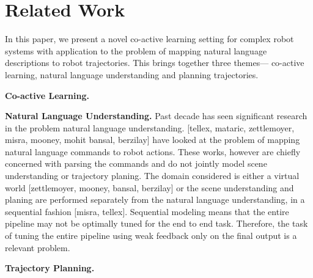 \section{Related Work}
In this paper, we present a novel co-active learning setting for complex robot systems with application to the problem of mapping natural language descriptions to robot trajectories. This brings together three themes--- co-active learning, natural language understanding and planning trajectories.

\noindent\textbf{Co-active Learning.}

\noindent\textbf{Natural Language Understanding.}  Past decade has seen significant research in the problem natural language understanding. [tellex, mataric, zettlemoyer, misra, mooney, mohit bansal, berzilay] have looked at the problem of mapping natural language commands to robot actions. These works, however are chiefly concerned with parsing the commands and do not jointly model scene understanding or trajectory planing. The domain considered is either a virtual world [zettlemoyer, mooney, bansal, berzilay] or the scene understanding and planing are performed separately from the natural language understanding, in a sequential fashion [misra, tellex]. Sequential modeling means that the entire pipeline may not be optimally tuned for the end to end task. Therefore, the task of tuning the entire pipeline using weak feedback only on the final output is a relevant problem.

\noindent\textbf{Trajectory Planning.}

\iffalse
The TellMeDave system translates natural language sentences to actions
sequences. PlanIt systems evaluates planning trajectories based on human
context. We have combined the systems resulting in an end-to-end system which
uses RoboBrain for features running on Weaver. 
\fi

